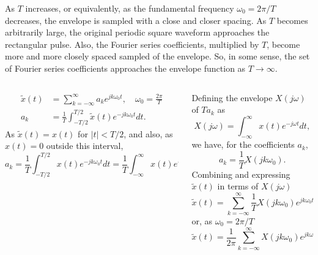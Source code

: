 \begin{frame}
    As $T$ increases, or equivalently, as the fundamental frequency $\omega_0 = 2\pi/T$ decreases, the envelope is sampled with a close and closer spacing. As $T$ becomes arbitrarily large, the original periodic square waveform approaches the rectangular pulse. Also, the Fourier series coefficients, multiplied by $T$, become more and more closely spaced sampled of the envelope. So, in some sense, the set of Fourier series coefficients  approaches the envelope function as $T\rightarrow \infty$.
\end{frame}


\begin{frame}


    \begin{columns}[T]
        \begin{column}{0.5\textwidth}
            
            \begin{align*}
                \tilde{x}(t) &= \sum_{k=-\infty}^{\infty}a_ke^{jk\omega_0 t},\quad \omega_0 =\frac{2\pi}{T}\\
                a_k &= \frac{1}{T}\int_{-T/2}^{T/2}\tilde{x}(t)e^{-jk\omega_0 t}dt.
            \end{align*}
            As $\tilde{x}(t) = x(t)$ for $|t| < T/2$, and also, as $x(t) = 0$ outside this interval,
            \begin{equation*}
                a_k = \frac{1}{T}\int_{-T/2}^{T/2}x(t)e^{-jk\omega_0 t}dt = \frac{1}{T}\int_{-\infty}^{\infty}x(t)e^{-jk\omega_0 t}dt.
            \end{equation*}
        \end{column}
        \begin{column}{0.5\textwidth}
            Defining the envelope $X(j\omega)$ of $Ta_k$ as
            \begin{equation*}
                X(j\omega) = \int_{-\infty}^{\infty}x(t)e^{-j\omega t}dt,
            \end{equation*}
            we have, for the coefficients $a_k$,
            \begin{equation*}
                a_k = \frac{1}{T}X(jk\omega_0).
            \end{equation*}
            Combining and expressing $\tilde{x}(t)$ in terms of $X(j\omega)$
            \begin{equation*}
                \tilde{x}(t) = \sum_{k=-\infty}^{\infty} \frac{1}{T}X(jk\omega_0)e^{jk\omega_0 t},
            \end{equation*}
            or, as $\omega_0 =2\pi/T$
            \begin{equation}
                \label{eq:xtildet_with_ft}
                \tilde{x}(t) = \frac{1}{2\pi}\sum_{k=-\infty}^{\infty} X(jk\omega_0)e^{jk\omega_0 t}\omega_0.
            \end{equation}
        \end{column}
    \end{columns}
\end{frame}


